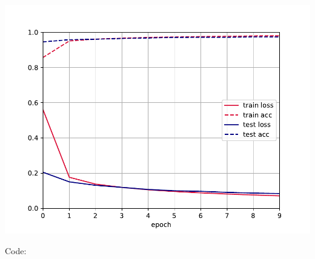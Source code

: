 \documentclass[submit]{harvardml}
\begin{document}
\includegraphics[width=\linewidth]{final_plot}

Code:
\end{document}
